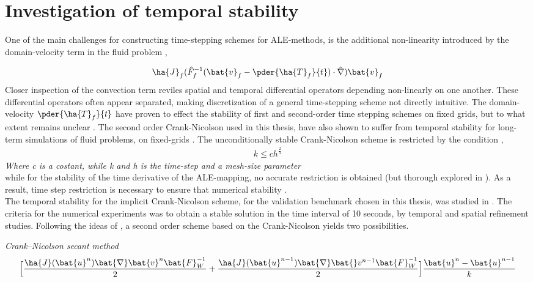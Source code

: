 \newpage

\section{Investigation of temporal stability}
One of the main challenges for constructing time-stepping schemes for ALE-methods, is the additional non-linearity introduced by the domain-velocity term in the fluid problem \cite{Formaggia2004}, 

\begin{align}
\ha{J}_f (\hat{F}_f^{-1}(\bat{v}_f - \pder{\ha{T}_f}{t}) \cdot \hat{\nabla}) \bat{v}_f
\end{align} 
Closer inspection of the convection term reviles spatial and temporal differential operators depending non-linearly on one another. These differential operators often appear separated, making discretization of a general time-stepping scheme not directly intuitive. The domain-velocity $ \pder{\ha{T}_f}{t}$ have proven to effect the stability of first and second-order time stepping schemes on fixed grids, but to what extent remains unclear  \cite{Formaggia2004, Formaggia1991}. The second order Crank-Nicolson used in this thesis, have also shown to suffer from temporal stability for long-term simulations of fluid problems, on fixed-grids \cite{Wick2013a}.
The  unconditionally stable Crank-Nicolson scheme is restricted by the condition \cite{Wick2013a},
\begin{align}
k \leq ch^{\frac{2}{3}} 
\end{align}
\textit{Where c is a costant, while k and h is the time-step and a mesh-size parameter } \\

while for the stability of the time derivative of the ALE-mapping, no accurate restriction is obtained (but thorough explored in \cite{Formaggia2004}). As a result, time step restriction is necessary to ensure that numerical stability  \cite{Formaggia2004}.  \\

The temporal stability for the implicit Crank-Nicolson scheme, for the validation benchmark chosen in this thesis, was studied in  \cite{Richter2015}. The criteria for the numerical experiments was to obtain a stable solution in the time interval of 10 seconds, by temporal and spatial refinement studies.  Following the ideas of \cite{Richter2015}, a second order scheme based on the Crank-Nicolson yields two possibilities.

\begin{discr}
\textit{Crank–Nicolson secant method }
\begin{align*}
\Big[\frac{\ha{J}(\bat{u}^{n}) \bat{\nabla} \bat{v}^{n} \bat{F}_W^{-1}}{2} 
+ \frac{\ha{J}(\bat{u}^{n-1}) \bat{\nabla} \bat{}v^{n-1} \bat{F}_W^{-1}}{2} \Big] 
\frac{\bat{u}^{n} - \bat{u}^{n-1}}{k}
\end{align*} 
\label{eq:cn1}
\end{discr}

